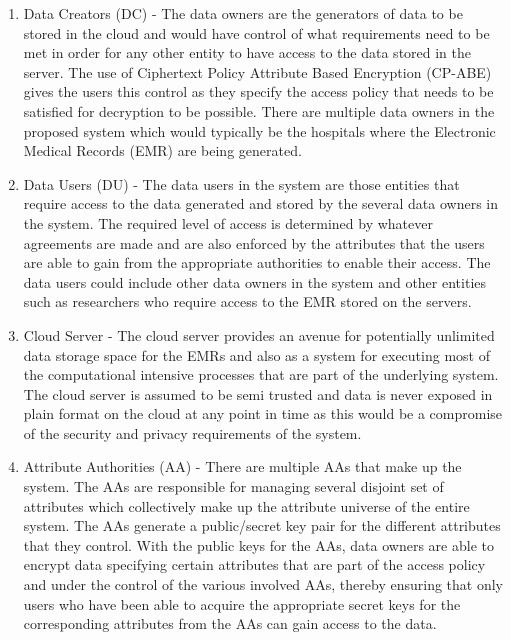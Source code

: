 \begin{enumerate}

\item Data Creators (DC) - The data owners are the generators of data to be stored in the cloud and would have control of what requirements need to be met in order for any other entity to have access to the data stored in the server. The use of Ciphertext Policy Attribute Based Encryption (CP-ABE) gives the users this control as they specify the access policy that needs to be satisfied for decryption to be possible. There are multiple data owners in the proposed system which would typically be the hospitals where the Electronic Medical Records (EMR) are being generated.

\item Data Users (DU) - The data users in the system are those entities that require access to the data generated and stored by the several data owners in the system. The required level of access is determined by whatever agreements are made and are also enforced by the attributes that the users are able to gain from the appropriate authorities to enable their access. The data users could include other data owners in the system and other entities such as researchers who require access to the EMR stored on the servers.

\item Cloud Server - The cloud server provides an avenue for potentially unlimited data storage space for the EMRs and also as a system for executing most of the computational intensive processes that are part of the underlying system. The cloud server is assumed to be semi trusted and data is never exposed in plain format on the cloud at any point in time as this would be a compromise of the security and privacy requirements of the system.

\item Attribute Authorities (AA) - There are multiple AAs that make up the system. The AAs are responsible for managing several disjoint set of attributes which collectively make up the attribute universe of the entire system. The AAs generate a public/secret key pair for the different attributes that they control. With the public keys for the AAs, data owners are able to encrypt data specifying certain attributes that are part of the access policy and under the control of the various involved AAs, thereby ensuring that only users who have been able to acquire the appropriate secret keys for the corresponding attributes from the AAs can gain access to the data.


\end{enumerate}
